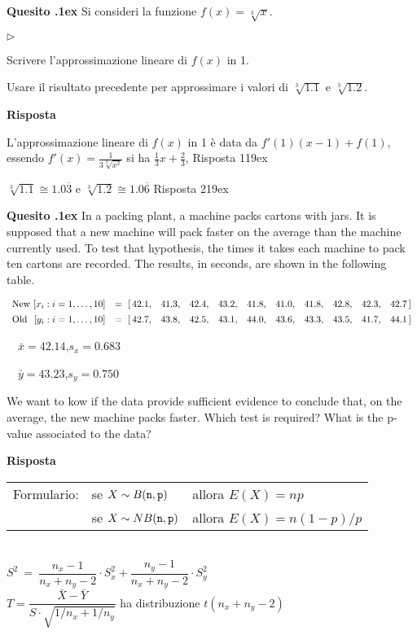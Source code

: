 \documentclass[11pt,twoside,a4paper]{article}
\newcommand{\mylabel}[1]{#1\hfill}
\renewenvironment{itemize}
  {\begin{list}{$\triangleright$}{%
   \setlength{\parskip}{0mm}
   \setlength{\topsep}{.4\baselineskip}
   \setlength{\rightmargin}{0mm}
   \setlength{\listparindent}{0mm}
   \setlength{\itemindent}{0mm}
   \setlength{\labelwidth}{2ex}
   \setlength{\itemsep}{.4\baselineskip}
   \setlength{\parsep}{0mm}
   \setlength{\partopsep}{0mm}
   \setlength{\labelsep}{1ex}
   \setlength{\leftmargin}{\labelwidth+\labelsep}
   \let\makelabel\mylabel}}{%
   \end{list}\vspace*{-1.3mm}}
\newcounter{quesito}
\newenvironment{question}{\addtocounter{quesito}{1}\par\textbf{Quesito \thequesito.\kern1ex}}{\vspace{0.5\parskip}}
\newenvironment{answer}{\par\textbf{Risposta\quad}}{\vspace{\parskip}}
\begin{document}
\begin{question}
Si consideri la funzione $f(x) = \sqrt[3]{x}$.
\begin{itemize}
\item[1.] Scrivere l'approssimazione lineare di $f(x)$ in 1.
\item[2.] Usare il risultato precedente per approssimare i valori di $\sqrt[3]{1.1}$ e $\sqrt[3]{1.2}$.
\end{itemize}
\begin{answer}

L'approssimazione lineare di $f(x)$ in 1 è data da $f'(1)(x-1) + f(1)$, essendo $f'(x) = \frac{1}{3\sqrt[3]{x^2}}$ si ha
{\color{blue}
$\frac{1}{3}x+\frac{2}{3}$,  \hfill Risposta 1\kern19ex}

{\color{blue}
$\sqrt[3]{1.1} \cong 1.0\overline{3}$ e $\sqrt[3]{1.2} \cong 1.0\overline{6}$
\hfill Risposta 2\kern19ex}

\end{answer}
\end{question}

\begin{question}
In a packing plant, a machine packs cartons with jars. It is supposed that a new machine will pack faster on the average than the machine currently used. To test that hypothesis, the times it takes each machine to pack ten cartons are recorded. The results, in seconds, are shown in the following table.

$\begin{array}{llllllllllll}
\textrm{New }[x_i:i=1,\dots,10] &=\  [\,42.1,&  41.3,&  42.4,&  43.2,&  41.8,&  41.0,&  41.8,&  42.8,&  42.3,&  42.7\,]
\\[1ex]
\textrm{Old }\hfill [y_i:i=1,\dots,10] &=\ [\,42.7,& 43.8,& 42.5,& 43.1,& 44.0,& 43.6,& 43.3,& 43.5,& 41.7,& 44.1\,]
\end{array}$\smallskip

$\quad\bar x = 42.14$,\quad$s_x= 0.683$

$\quad\bar y = 43.23$,\quad$s_y=  0.750$

We want to kow if the data provide sufficient evidence to conclude that, 
on the average, the new machine packs faster. 
Which test is required? What is the p-value associated to the data?
\begin{answer}

\end{answer}
\end{question}

\vfill\hrulefill\par
\begin{tabular}{@{}lll}
Formulario:& se $X\sim B({\tt n},{\tt p})$ & allora $E(X)=np$\\
           & se $X\sim NB({\tt n},{\tt p})$& allora $E(X)=n(1-p)/p$\\
\end{tabular}
\\[1ex]
$S^2\ =\ \dfrac{n_x-1}{n_x+n_y-2}\cdot S_x^2 + \dfrac{n_y-1}{n_x+n_y-2}\cdot S_y^2$\\[1ex]
$T=\dfrac{\bar X-\bar Y}{S\cdot\sqrt{1/n_x+1/n_y}}$ 
ha distribuzione $t(n_x+n_y-2)$\\
\end{document}
